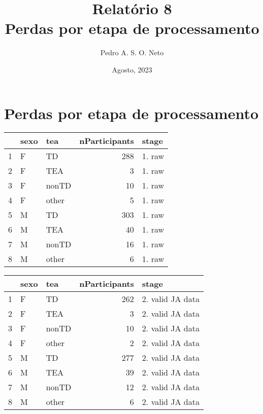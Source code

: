 \documentclass{article}
\title{Relatório 8 \\ Perdas por etapa de processamento}
\author{Pedro A. S. O. Neto}
\date{Agosto, 2023}
\begin{document}
\maketitle

\section{Perdas por etapa de processamento}

\begin{table}[ht]
\centering
\begin{tabular}{rllrl}
  \hline
 & sexo & tea & nParticipants & stage \\ 
  \hline
  1 & F & TD & 288 & 1. raw \\ 
  2 & F & TEA &   3 & 1. raw \\ 
  3 & F & nonTD &  10 & 1. raw \\ 
  4 & F & other &   5 & 1. raw \\ 
  5 & M & TD & 303 & 1. raw \\ 
  6 & M & TEA &  40 & 1. raw \\ 
  7 & M & nonTD &  16 & 1. raw \\ 
  8 & M & other &   6 & 1. raw \\ 
   \hline
\end{tabular}
\end{table}

\begin{table}[ht]
\centering
\begin{tabular}{rllrl}
  \hline
 & sexo & tea & nParticipants & stage \\ 
  \hline
  1 & F & TD & 262 & 2. valid JA data \\ 
  2 & F & TEA &   3 & 2. valid JA data \\ 
  3 & F & nonTD &  10 & 2. valid JA data \\ 
  4 & F & other &   2 & 2. valid JA data \\ 
  5 & M & TD & 277 & 2. valid JA data \\ 
  6 & M & TEA &  39 & 2. valid JA data \\ 
  7 & M & nonTD &  12 & 2. valid JA data \\ 
  8 & M & other &   6 & 2. valid JA data \\ 
   \hline
\end{tabular}
\end{table}
\end{document}
